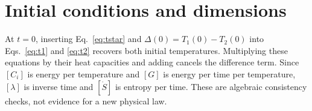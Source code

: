 \section{Initial conditions and dimensions}\label{app:checks}
At $t=0$, inserting Eq.~\eqref{eq:tstar} and $\Delta(0)=T_1(0)-T_2(0)$ into Eqs.~\eqref{eq:t1} and \eqref{eq:t2} recovers both initial temperatures. Multiplying these equations by their heat capacities and adding cancels the difference term. Since $[C_i]$ is energy per temperature and $[G]$ is energy per time per temperature, $[\lambda]$ is inverse time and $[\dot S]$ is entropy per time. These are algebraic consistency checks, not evidence for a new physical law.
